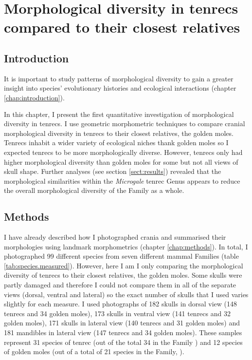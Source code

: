 \chapter{Morphological diversity in tenrecs compared to their closest relatives}
\label{chap:disparity}

\section{Introduction}

	It is important to study patterns of morphological diversity to gain a greater insight into species' evolutionary histories and ecological interactions (chapter \ref{chap:introduction}). 
	
	In this chapter, I present the first quantitative investigation of morphological diversity in tenrecs. I use geometric morphometric techniques \citep{Rohlf1993} to compare cranial morphological diversity in tenrecs to their closest relatives, the golden moles. Tenrecs inhabit a wider variety of ecological niches thank golden moles \citep{Soarimalala2011, Bronner1995} so I expected tenrecs to be more morphologically diverse. However, tenrecs only had higher morphological diversity than golden moles for some but not all views of skull shape. Further analyses (see section \ref{sect:results}) revealed that the morphological similarities within the \textit{Microgale} tenrec Genus appears to reduce the overall morphological diversity of the Family as a whole.

\section{Methods}

	I have already described how I photographed crania and summarised their morphologies using landmark morphometrics (chapter \ref{chap:methods}). In total, I photographed 99 different species from seven different mammal Families (table \ref{tab:species.measured}). However, here I am I only comparing the morphological diversity of tenrecs to their closest relatives, the golden moles. Some skulls were partly damaged and therefore I could not compare them in all of the separate views (dorsal, ventral and lateral) so the exact number of skulls that I used varies slightly for each measure. I used photographs of 182 skulls in dorsal view (148 tenrecs and 34 golden moles), 173 skulls in ventral view (141 tenrecs and 32 golden moles), 171 skulls in lateral view (140 tenrecs and 31 golden moles) and 181 mandibles in lateral view (147 tenrecs and 34 golden moles). These samples represent 31 species of tenrec (out of the total 34 in the Family \citep{Olson2013}) and 12 species of golden moles (out of a total of 21 species in the Family, \citep{Asher2010}).

